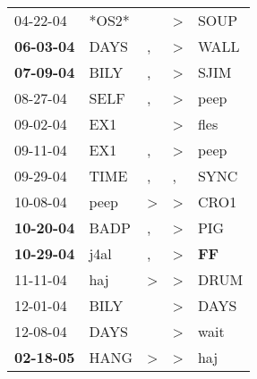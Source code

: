 \begin{supertabular}{p{0.07\textwidth}p{0.06\textwidth}p{0.02\textwidth}p{0.02\textwidth}p{0.06\textwidth}}
          04-22-04\textsuperscript{} &                            *OS2* &                  &     \textgreater &           SOUP\textsuperscript{} \\
 \textbf{06-03-04\textsuperscript{}} &           DAYS\textsuperscript{} &                , &     \textgreater &           WALL\textsuperscript{} \\
 \textbf{07-09-04\textsuperscript{}} &           BILY\textsuperscript{} &                , &     \textgreater &           SJIM\textsuperscript{} \\
          08-27-04\textsuperscript{} &           SELF\textsuperscript{} &                , &     \textgreater &           peep\textsuperscript{} \\
          09-02-04\textsuperscript{} &            EX1\textsuperscript{} &                  &     \textgreater &           fles\textsuperscript{} \\
          09-11-04\textsuperscript{} &            EX1\textsuperscript{} &                , &     \textgreater &           peep\textsuperscript{} \\
          09-29-04\textsuperscript{} &           TIME\textsuperscript{} &                , &                , &           SYNC\textsuperscript{} \\
          10-08-04\textsuperscript{} &           peep\textsuperscript{} &     \textgreater &     \textgreater &           CRO1\textsuperscript{} \\
 \textbf{10-20-04\textsuperscript{}} &           BADP\textsuperscript{} &                , &     \textgreater &            PIG\textsuperscript{} \\
 \textbf{10-29-04\textsuperscript{}} &           j4al\textsuperscript{} &                , &     \textgreater &    \textbf{FF\textsuperscript{}} \\
          11-11-04\textsuperscript{} &            haj\textsuperscript{} &     \textgreater &     \textgreater &           DRUM\textsuperscript{} \\
          12-01-04\textsuperscript{} &           BILY\textsuperscript{} &                  &     \textgreater &           DAYS\textsuperscript{} \\
          12-08-04\textsuperscript{} &           DAYS\textsuperscript{} &                  &     \textgreater &           wait\textsuperscript{} \\
 \textbf{02-18-05\textsuperscript{}} &           HANG\textsuperscript{} &     \textgreater &     \textgreater &            haj\textsuperscript{} \\

\end{supertabular}
